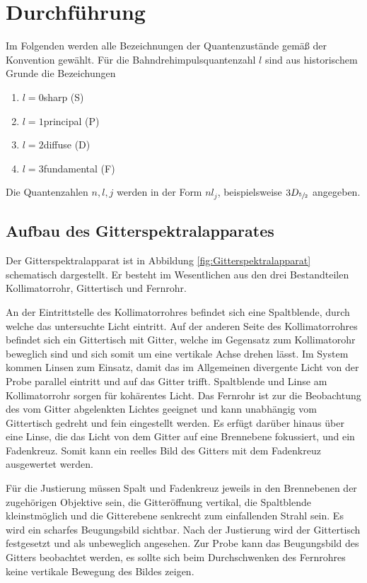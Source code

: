 \section{Durchf\"uhrung}
\label{sec:Durchfuehrung}
Im Folgenden werden alle Bezeichnungen der Quantenzustände gemäß der Konvention gewählt.
Für die Bahndrehimpulsquantenzahl $l$ sind aus historischem Grunde die Bezeichungen 
\begin{enumerate}
\item{$l=0$}{sharp (S)}
\item{$l=1$}{principal (P)}
\item{$l=2$}{diffuse (D)}
\item{$l=3$}{fundamental (F)}
\end{enumerate}
Die Quantenzahlen $n,l,j$ werden in der Form $nl_j$, beispielsweise $3D_{\sfrac{5}{2}}$ angegeben.
\subsection{Aufbau des Gitterspektralapparates}
Der Gitterspektralapparat ist in Abbildung \ref{fig:Gitterspektralapparat} schematisch dargestellt.
Er besteht im Wesentlichen aus den drei Bestandteilen Kollimatorrohr, Gittertisch und Fernrohr.

An der Eintrittstelle des Kollimatorrohres befindet sich eine Spaltblende, durch welche das untersuchte Licht eintritt.
Auf der anderen Seite des Kollimatorrohres befindet sich ein Gittertisch mit Gitter, welche im Gegensatz zum Kollimatorohr beweglich sind und sich somit um eine vertikale Achse drehen lässt. 
Im System kommen Linsen zum Einsatz, damit das im Allgemeinen divergente Licht von der Probe parallel eintritt und auf das Gitter trifft.
Spaltblende und Linse am Kollimatorrohr sorgen für kohärentes Licht.
Das Fernrohr ist zur die Beobachtung des vom Gitter abgelenkten Lichtes geeignet und kann unabhängig vom Gittertisch gedreht und fein eingestellt werden. 
Es erfügt darüber hinaus über eine Linse, die das Licht von dem Gitter auf eine Brennebene fokussiert, und ein Fadenkreuz.
Somit kann ein reelles Bild des Gitters mit dem Fadenkreuz ausgewertet werden.

Für die Justierung müssen Spalt und Fadenkreuz jeweils in den Brennebenen der zugehörigen Objektive sein, die Gitteröffnung vertikal, die Spaltblende kleinstmöglich und die Gitterebene senkrecht zum einfallenden Strahl sein. 
Es wird ein scharfes Beugungsbild sichtbar.
Nach der Justierung wird der Gittertisch festgesetzt und als unbeweglich angesehen.
Zur Probe kann das Beugungsbild des Gitters beobachtet werden, es sollte sich beim Durchschwenken des Fernrohres keine vertikale Bewegung des Bildes zeigen.

